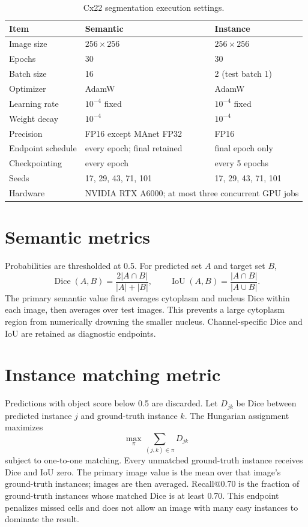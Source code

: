 \documentclass[11pt,oneside]{report}
\begin{document}
\begin{table}[H]
\centering
\caption{Cx22 segmentation execution settings.}
\label{tab:cx22-hparams}
\begin{tabular}{lll}
\toprule
Item & Semantic & Instance \\
\midrule
Image size & $256\times256$ & $256\times256$ \\
Epochs & 30 & 30 \\
Batch size & 16 & 2 (test batch 1) \\
Optimizer & AdamW & AdamW \\
Learning rate & $10^{-4}$ fixed & $10^{-4}$ fixed \\
Weight decay & $10^{-4}$ & $10^{-4}$ \\
Precision & FP16 except MAnet FP32 & FP16 \\
Endpoint schedule & every epoch; final retained & final epoch only \\
Checkpointing & every epoch & every 5 epochs \\
Seeds & 17, 29, 43, 71, 101 & 17, 29, 43, 71, 101 \\
Hardware & \multicolumn{2}{l}{NVIDIA RTX A6000; at most three concurrent GPU jobs} \\
\bottomrule
\end{tabular}
\end{table}

\section{Semantic metrics}

Probabilities are thresholded at 0.5. For predicted set $A$ and target set $B$,
\begin{equation}
\operatorname{Dice}(A,B)=\frac{2|A\cap B|}{|A|+|B|},\qquad
\operatorname{IoU}(A,B)=\frac{|A\cap B|}{|A\cup B|}.
\end{equation}
The primary semantic value first averages cytoplasm and nucleus Dice within each image, then averages over test images. This prevents a large cytoplasm region from numerically drowning the smaller nucleus. Channel-specific Dice and IoU are retained as diagnostic endpoints.

\section{Instance matching metric}

Predictions with object score below 0.5 are discarded. Let $D_{jk}$ be Dice between predicted instance $j$ and ground-truth instance $k$. The Hungarian assignment~\cite{kuhn1955hungarian} maximizes
\begin{equation}
\max_{\pi}\sum_{(j,k)\in\pi}D_{jk}
\end{equation}
subject to one-to-one matching. Every unmatched ground-truth instance receives Dice and IoU zero. The primary image value is the mean over that image's ground-truth instances; images are then averaged. Recall@0.70 is the fraction of ground-truth instances whose matched Dice is at least 0.70. This endpoint penalizes missed cells and does not allow an image with many easy instances to dominate the result.
\end{document}
